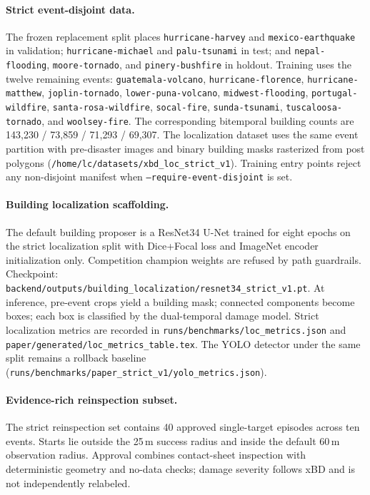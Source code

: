 \paragraph{Strict event-disjoint data.}
The frozen replacement split places
\texttt{hurricane-harvey} and \texttt{mexico-earthquake} in validation;
\texttt{hurricane-michael} and \texttt{palu-tsunami} in test; and
\texttt{nepal-flooding}, \texttt{moore-tornado}, and
\texttt{pinery-bushfire} in holdout.
Training uses the twelve remaining events:
\texttt{guatemala-volcano},
\texttt{hurricane-florence},
\texttt{hurricane-matthew},
\texttt{joplin-tornado},
\texttt{lower-puna-volcano},
\texttt{midwest-flooding},
\texttt{portugal-wildfire},
\texttt{santa-rosa-wildfire},
\texttt{socal-fire},
\texttt{sunda-tsunami},
\texttt{tuscaloosa-tornado}, and
\texttt{woolsey-fire}.
The corresponding bitemporal building counts are 143{,}230 / 73{,}859 /
71{,}293 / 69{,}307.
The localization dataset uses the same event partition with pre-disaster
images and binary building masks rasterized from post polygons
(\texttt{/home/lc/datasets/xbd\_loc\_strict\_v1}).
Training entry points reject any non-disjoint manifest when
\texttt{--require-event-disjoint} is set.

\paragraph{Building localization scaffolding.}
The default building proposer is a ResNet34 U-Net trained for eight epochs
on the strict localization split with Dice+Focal loss and ImageNet encoder
initialization only.
Competition champion weights are refused by path guardrails.
Checkpoint:
\texttt{backend/outputs/building\_localization/resnet34\_strict\_v1.pt}.
At inference, pre-event crops yield a building mask; connected components
become boxes; each box is classified by the dual-temporal damage model.
Strict localization metrics are recorded in
\texttt{runs/benchmarks/loc\_metrics.json} and
\texttt{paper/generated/loc\_metrics\_table.tex}.
The YOLO detector under the same split remains a rollback baseline
(\texttt{runs/benchmarks/paper\_strict\_v1/yolo\_metrics.json}).

\paragraph{Evidence-rich reinspection subset.}
The strict reinspection set contains 40 approved single-target episodes
across ten events.
Starts lie outside the 25\,m success radius and inside the default 60\,m
observation radius.
Approval combines contact-sheet inspection with deterministic geometry and
no-data checks; damage severity follows xBD and is not independently
relabeled.

